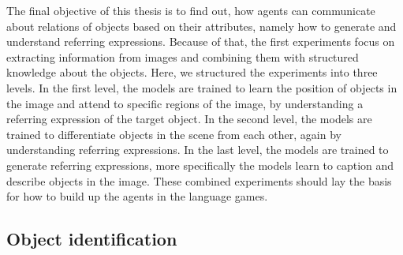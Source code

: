 The final objective of this thesis is to find out, how agents can communicate about relations of objects based on their attributes, namely how to generate and understand referring expressions.
Because of that, the first experiments focus on extracting information from images and combining them with structured knowledge about the objects.
Here, we structured the experiments into three levels.
In the first level, the models are trained to learn the position of objects in the image and attend to specific regions of the image, by understanding a referring expression of the target object.
In the second level, the models are trained to differentiate objects in the scene from each other, again by understanding referring expressions.
In the last level, the models are trained to generate referring expressions, more specifically the models learn to caption and describe objects in the image.
These combined experiments should lay the basis for how to build up the agents in the language games.

\subsection{Object identification}
